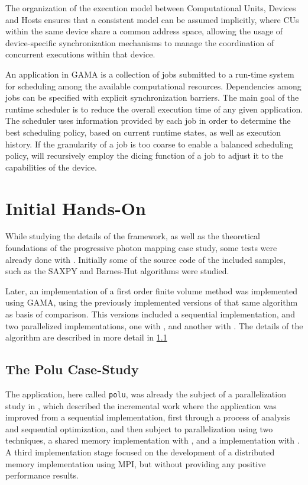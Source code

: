 \documentclass[main.tex]{subfiles}
\begin{document}
The organization of the execution model between Computational Units, Devices and Hosts ensures that a consistent model can be assumed implicitly, where \acsp{CU} within the same device share a common address space, allowing the usage of device-specific synchronization mechanisms to manage the coordination of concurrent executions within that device.

An application in GAMA is a collection of jobs submitted to a run-time system for scheduling among the available computational resources. Dependencies among jobs can be specified with explicit synchronization barriers. The main goal of the runtime scheduler is to reduce the overall execution time of any given application. The scheduler uses information provided by each job in order to determine the best scheduling policy, based on current runtime states, as well as execution history. If the granularity of a job is too coarse to enable a balanced scheduling policy, \gama will recursively employ the dicing function of a job to adjust it to the capabilities of the device.





\section{Initial \gama Hands-On}

While studying the details of the framework, as well as the theoretical foundations of the progressive photon mapping case study, some tests were already done with \gama. Initially some of the source code of the included samples, such as the SAXPY and Barnes-Hut algorithms were studied.

Later, an implementation of a first order finite volume method was implemented using GAMA, using the previously implemented versions of that same algorithm as basis of comparison. This versions included a sequential implementation, and two parallelized implementations, one with \openmp, and another with \cuda. The details of the algorithm are described in more detail in \cref{sec:polu}

\subsection{The Polu Case-Study} \label{sec:polu}

The application, here called \texttt{polu}, was already the subject of a parallelization study in \cite{naps2012}, which described the incremental work where the application was improved from a sequential implementation, first through a process of analysis and sequential optimization, and then subject to parallelization using two techniques, a shared memory \cpu implementation with \openmp, and a \gpu implementation with \cuda. A third implementation stage focused on the development of a distributed memory implementation using \acs{MPI}, but without providing any positive performance results.
\end{document}
